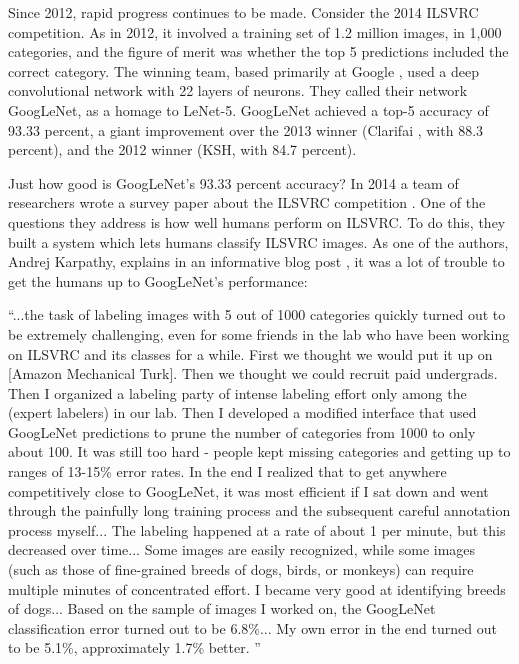  Since 2012, rapid progress continues to be made. Consider the 2014 ILSVRC competition. As in 2012, it involved a training set of 1.2 million images, in 1,000 categories, and the figure of merit was whether the top 5 predictions included the correct category. The winning team, based primarily at Google \cite{zegedyLJSRAEVR14}, used a deep convolutional network with 22 layers of neurons. They called their network GoogLeNet, as a homage to LeNet-5. GoogLeNet achieved a top-5 accuracy of 93.33 percent, a giant improvement over the 2013 winner (Clarifai \cite{clarifai2019}, with 88.3 percent), and the 2012 winner (KSH, with 84.7 percent).

Just how good is GoogLeNet's 93.33 percent accuracy? In 2014 a team of researchers wrote a survey paper about the ILSVRC competition \cite{RussakovskyDSKSMHKKBBF14}. One of the questions they address is how well humans perform on ILSVRC. To do this, they built a system which lets humans classify ILSVRC images. As one of the authors, Andrej Karpathy, explains in an informative blog post \cite{Karpathy2014}, it was a lot of trouble to get the humans up to GoogLeNet's performance: 

``...the task of labeling images with 5 out of 1000 categories quickly turned out to be extremely challenging, even for some friends in the lab who have been working on ILSVRC and its classes for a while. First we thought we would put it up on [Amazon Mechanical Turk]. Then we thought we could recruit paid undergrads. Then I organized a labeling party of intense labeling effort only among the (expert labelers) in our lab. Then I developed a modified interface that used GoogLeNet predictions to prune the number of categories from 1000 to only about 100. It was still too hard - people kept missing categories and getting up to ranges of 13-15\% error rates. In the end I realized that to get anywhere competitively close to GoogLeNet, it was most efficient if I sat down and went through the painfully long training process and the subsequent careful annotation process myself... The labeling happened at a rate of about 1 per minute, but this decreased over time... Some images are easily recognized, while some images (such as those of fine-grained breeds of dogs, birds, or monkeys) can require multiple minutes of concentrated effort. I became very good at identifying breeds of dogs... Based on the sample of images I worked on, the GoogLeNet classification error turned out to be 6.8\%... My own error in the end turned out to be 5.1\%, approximately 1.7\% better. ''

